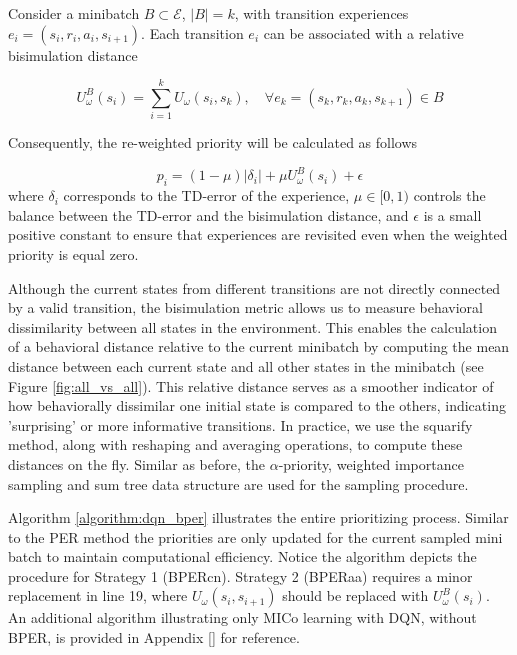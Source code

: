 \begin{strategy}
Consider a minibatch $B \subset \mathcal{E}$, $|B| = k$, with transition experiences $e_i = (s_i, r_i, a_i, s_{i+1})$. Each transition $e_i$ can be associated with a relative bisimulation distance

\begin{equation}
    U^B_\omega(s_i) = \sum_{i=1}^k U_\omega(s_i, s_k), \quad \forall e_k = (s_k, r_k, a_k, s_{k+1}) \in B
\end{equation}

Consequently, the re-weighted priority will be calculated as follows

\begin{equation}
    p_i = (1 - \mu) |\delta_i| + \mu U^B_\omega(s_i) + \epsilon
\end{equation}
where \(\delta_i\) corresponds to the TD-error of the experience, \(\mu \in [0,1)\) controls the balance between the TD-error and the bisimulation distance, and \(\epsilon\) is a small positive constant to ensure that experiences are revisited even when the weighted priority is equal zero.
\end{strategy}


Although the current states from different transitions are not directly connected by a valid transition, the bisimulation metric allows us to measure behavioral dissimilarity between all states in the environment. This enables the calculation of a behavioral distance relative to the current minibatch by computing the mean distance between each current state and all other states in the minibatch (see Figure \ref{fig:all_vs_all}). This relative distance serves as a smoother indicator of how behaviorally dissimilar one initial state is compared to the others, indicating 'surprising' or more informative transitions. In practice, we use the squarify method, along with reshaping and averaging operations, to compute these distances on the fly. Similar as before, the $\alpha$-priority, weighted importance sampling and sum tree data structure are used for the sampling procedure.


Algorithm \ref{algorithm:dqn_bper} illustrates the entire prioritizing process. Similar to the PER method the priorities are only updated for the current sampled mini batch to maintain computational efficiency. Notice the algorithm depicts the procedure for Strategy 1 (BPERcn). Strategy 2 (BPERaa) requires a minor replacement in line 19, where \(U_\omega(s_i, s_{i+1})\) should be replaced with \(U^B_\omega(s_i)\). An additional algorithm illustrating only MICo learning with DQN, without BPER, is provided in Appendix \ref{} for reference.

